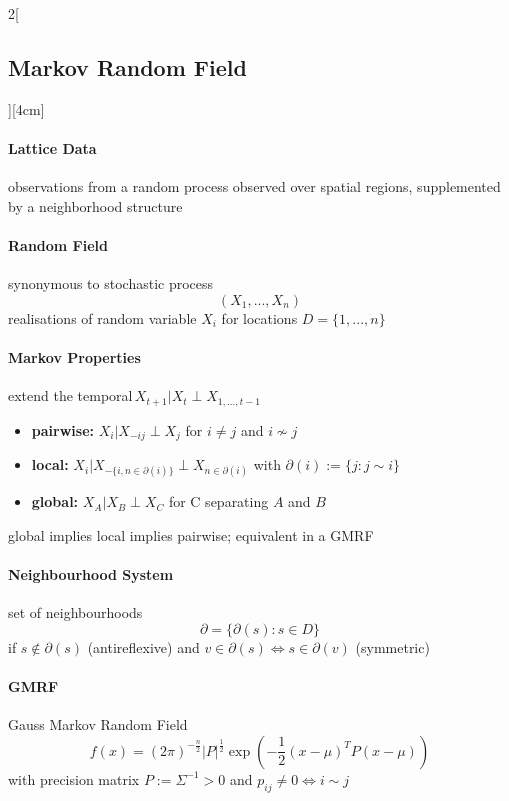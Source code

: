 \documentclass[8pt]{extarticle}
\begin{document}
\begin{multicols}{2}[\subsection{Markov Random Field}][4cm] 
\paragraph{Lattice Data} observations from a random process observed over spatial regions,  supplemented by a neighborhood structure

\paragraph{Random Field} synonymous to stochastic process
$$(X_1,...,X_n)$$
realisations of random variable $X_i$ 
for locations $D=\{1,...,n\}$

\paragraph{Markov Properties} extend the temporal\,$X_{t{+}1}|X_t \perp X_{1,...,t-{}1}$
\begin{itemize}
\item \textbf{pairwise:} $X_i|X_{-ij}\perp X_j$ for $i\neq j$ and $i \not\sim j$
\item \textbf{local:} $X_i|X_{-\{i,n\in \partial (i)\}}\perp X_{n\in \partial (i)}$ with $\partial (i) := \{j:j\sim i\}$
\item \textbf{global:} $X_A|X_B\perp X_C$ for C separating $A$ and $B$
\end{itemize}
\noindent global implies local implies pairwise; equivalent in a GMRF

\paragraph{Neighbourhood System} set of neighbourhoods
$$\partial = \{\partial(s): s \in D\}$$
\noindent if $s \not\in \partial(s)$ (antireflexive) and $v \in \partial(s) \Leftrightarrow s \in \partial(v)$ (symmetric)

\paragraph{GMRF} Gauss Markov Random Field
$$f(x) =  ( 2\pi)^{-\frac{n}{2}}|P|^{\frac{1}{2}} \exp\left(-\frac{1}{2}(x-\mu)^TP(x-\mu)\right)$$
\noindent with precision matrix $P:=\Sigma^{-1}>0$ and $p_{ij} \neq 0 \Leftrightarrow i\sim j$


\end{multicols}
\end{document}
